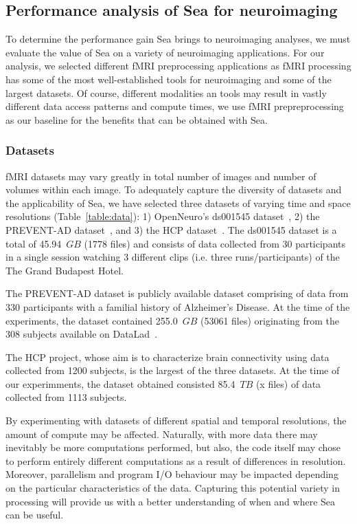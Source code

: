     \subsection{Performance analysis of Sea for neuroimaging}
    
    To determine the performance gain Sea brings to neuroimaging analyses, we must evaluate the value of Sea on a variety of neuroimaging
    applications. For our analysis, we selected different fMRI preprocessing applications as fMRI processing has some of the most
    well-established tools for neuroimaging and some of the largest datasets. Of course, different modalities an tools may result in
    vastly different data access patterns and compute times, we use fMRI prepreprocessing as our baseline for the benefits that can be
    obtained with Sea. 
    
    
    
    \subsubsection{Datasets}
    fMRI datasets may vary greatly in total number
    of images and number of volumes within each image. To adequately capture the 
    diversity of datasets and the applicability of Sea, we have selected three datasets of varying
    time and space resolutions (Table~\ref{table:data}): 1) OpenNeuro's ds001545 dataset~\cite{ds001545},
    2) the PREVENT-AD dataset~\cite{preventad}, and 3) the HCP dataset~\cite{HCP}.
    The ds001545 dataset is a total of 45.94~$GB$ (1778 files) and consists of data collected
    from 30 participants in a single session watching 3 different clips (i.e. three runs/participants) of the The Grand Budapest Hotel.
    
    
    The PREVENT-AD dataset is publicly available dataset comprising of data from 330 participants with a familial history
    of Alzheimer's Disease.
    At the time of the experiments, the dataset contained 255.0~$GB$ (53061 files) originating from the 308 subjects available on DataLad~\cite{}.
    
    The HCP project, whose aim is to characterize brain connectivity using data collected from 1200 subjects, is the largest of the three datasets.
    At the time of our experimments, the dataset obtained consisted 85.4~$TB$ (x files) of data collected from 1113 subjects.
    
    By experimenting with datasets of different spatial and temporal resolutions, the amount of compute may be affected.
    Naturally, with more data there may inevitably be more computations performed, but also, the code itself may
    chose to perform entirely different computations as a result of differences in resolution. Moreover, parallelism and program I/O behaviour
    may be impacted depending on the particular characteristics of the data. Capturing this potential
    variety in processing will provide us with a better understanding of when and where Sea can be useful.
    
